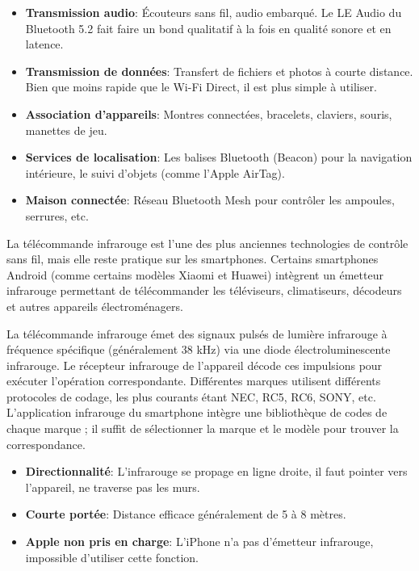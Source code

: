 
\begin{itemize}
  \item \textbf{Transmission audio}: Écouteurs sans fil, audio embarqué. Le LE Audio du Bluetooth 5.2 fait faire un bond qualitatif à la fois en qualité sonore et en latence.
  \item \textbf{Transmission de données}: Transfert de fichiers et photos à courte distance. Bien que moins rapide que le Wi-Fi Direct, il est plus simple à utiliser.
  \item \textbf{Association d'appareils}: Montres connectées, bracelets, claviers, souris, manettes de jeu.
  \item \textbf{Services de localisation}: Les balises Bluetooth (Beacon) pour la navigation intérieure, le suivi d'objets (comme l'Apple AirTag).
  \item \textbf{Maison connectée}: Réseau Bluetooth Mesh pour contrôler les ampoules, serrures, etc.
\end{itemize}


La télécommande infrarouge est l'une des plus anciennes technologies de contrôle sans fil, mais elle reste pratique sur les smartphones. Certains smartphones Android (comme certains modèles Xiaomi et Huawei) intègrent un émetteur infrarouge permettant de télécommander les téléviseurs, climatiseurs, décodeurs et autres appareils électroménagers.


La télécommande infrarouge émet des signaux pulsés de lumière infrarouge à fréquence spécifique (généralement 38 kHz) via une diode électroluminescente infrarouge. Le récepteur infrarouge de l'appareil décode ces impulsions pour exécuter l'opération correspondante. Différentes marques utilisent différents protocoles de codage, les plus courants étant NEC, RC5, RC6, SONY, etc. L'application infrarouge du smartphone intègre une bibliothèque de codes de chaque marque ; il suffit de sélectionner la marque et le modèle pour trouver la correspondance.


\begin{itemize}
  \item \textbf{Directionnalité}: L'infrarouge se propage en ligne droite, il faut pointer vers l'appareil, ne traverse pas les murs.
  \item \textbf{Courte portée}: Distance efficace généralement de 5 à 8 mètres.
  \item \textbf{Apple non pris en charge}: L'iPhone n'a pas d'émetteur infrarouge, impossible d'utiliser cette fonction.
\end{itemize}

